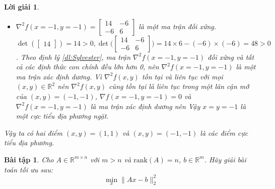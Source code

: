 \documentclass[14pt, a4paper]{article}
\theoremstyle{sltheorem}
\newtheorem{baitap}{Bài tập}
\theoremstyle{soltheorem}
\newtheorem*{loigiai}{Lời giải}
\begin{document}
\begin{loigiai}
\begin{itemize}
            Theo định lý \ref{dl:Sylvester}, ma trận $\nabla^2 f(x=1,y=1)$ đối xứng và tất cả các định thức con chính đều lớn hơn 0, nên $\nabla^2 f(x=1,y=1)$ là một ma trận xác định dương.
            Vì $\nabla^2 f(x, y)$ tồn tại và liên tục với mọi $(x, y) \in \mathbb{R}^2$ nên $\nabla^2 f(x, y)$ cũng tồn tại là liên tục trong một lân cận mở của $(x,y)=(1,1)$, $\nabla f(x=1,y=1)=0$ và $\nabla^2 f(x=1,y=1)$ là ma trận xác định dương nên $(x,y)=(1,1)$ là một cực tiểu địa phương ngặt.
            \item $\nabla^2 f(x=-1,y=-1)=\begin{bmatrix} 14 & -6 \\ -6 & 6 \end{bmatrix}$ là một ma trận đối xứng. $\det{(\begin{bmatrix}14\end{bmatrix})}=14>0, \det{\Big(\begin{bmatrix} 14 & -6 \\ -6 & 6 \end{bmatrix}\Big)}=14\times6 - (-6)\times(-6)=48>0$.
            Theo định lý \ref{dl:Sylvester}, ma trận $\nabla^2 f(x=-1,y=-1)$ đối xứng và tất cả các định thức con chính đều lớn hơn 0, nên $\nabla^2 f(x=-1,y=-1)$ là một ma trận xác định dương.
            Vì $\nabla^2 f(x, y)$ tồn tại và liên tục với mọi $(x, y) \in \mathbb{R}^2$ nên $\nabla^2 f(x, y)$ cũng tồn tại là liên tục trong một lân cận mở của $(x,y)=(-1,-1)$, $\nabla f(x=-1,y=-1)=0$ và $\nabla^2 f(x=-1,y=-1)$ là ma trận xác định dương nên Vậy $x=y=-1$ là một cực tiểu địa phương ngặt.
        \end{itemize}
        Vậy ta có hai điểm $(x,y)=(1, 1)$ và $(x,y)=(-1,-1)$ là các điểm cực tiểu địa phương.
    \end{loigiai}

    \begin{baitap}
        Cho $A \in \mathbb{R}^{m \times n}$ với $m > n$ và $\mathrm{rank}(A)=n$, $b \in \mathbb{R}^{m}$. Hãy giải bài toán tối ưu sau:
        \begin{equation*}
            \min_x \lVert Ax - b \rVert_2^2
        \end{equation*}
    \end{baitap}
\end{document}
